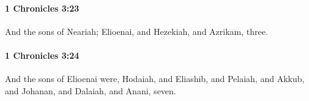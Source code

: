 		\paragraph{1 Chronicles 3:23} %
			\label{1CHRONICLES-3-23}

			And the sons of Neariah; Elioenai, and Hezekiah, and Azrikam, three.


		\paragraph{1 Chronicles 3:24} %
			\label{1CHRONICLES-3-24}

			And the sons of Elioenai were, Hodaiah, and Eliashib, and Pelaiah, and Akkub, and Johanan, and Dalaiah, and Anani, seven.

